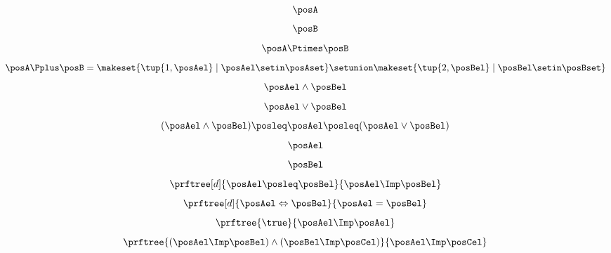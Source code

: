 {\begin{forslides}
\begin{equation}
    \end{equation}
    \begin{equation}
        \label{eq:pos_P}
        \posA
    \end{equation}
    \begin{equation}
        \label{eq:pos_Q}
        \posB
    \end{equation}
    \begin{equation}
        \label{eq:pos_PQ}
        \posA\Ptimes \posB
    \end{equation}
    \begin{equation}
        \label{eq:set_disj}
        \posA\Pplus\posB=\makeset{ \tup{1,\posAel} \mid \posAel\setin \posAset }\setunion \makeset{\tup{2,\posBel}\mid \posBel \setin \posBset}
    \end{equation}
    \begin{equation}
        \label{eq:latt_1}
        \posAel \wedge \posBel
    \end{equation}
    \begin{equation}
        \label{eq:latt_2}
        \posAel \vee \posBel
    \end{equation}
    \begin{equation}
        \label{eq:latt_3}
        (\posAel \wedge \posBel)\posleq \posAel \posleq (\posAel \vee \posBel)
    \end{equation}
    \begin{equation}
        \label{eq:latt_4}
        \posAel
    \end{equation}
    \begin{equation}
        \label{eq:latt_5}
        \posBel
    \end{equation}
    \begin{equation}
        \label{eq:prop_1}
        \prftree[d]{\posAel \posleq \posBel}{\posAel \Imp \posBel}
    \end{equation}
    \begin{equation}
        \label{eq:prop_2}
        \prftree[d]{\posAel \Leftrightarrow \posBel}{\posAel = \posBel}
    \end{equation}
    \begin{equation}
        \label{eq:prop_3}
        \prftree{\true}{\posAel \Imp \posAel}
    \end{equation}
    \begin{equation}
        \label{eq:prop_4}
        \prftree{(\posAel \Imp \posBel)\wedge (\posBel \Imp \posCel)}{\posAel \Imp \posCel}
    \end{equation}

\end{forslides}}
